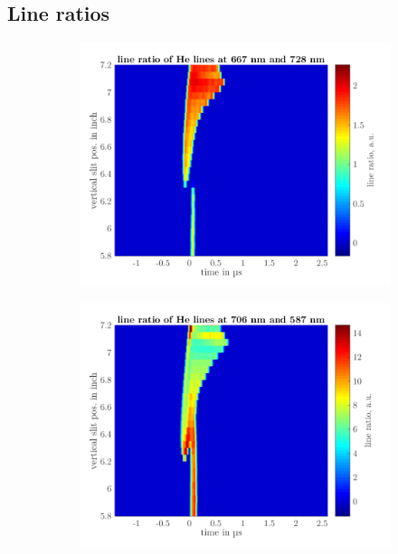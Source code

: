 \documentclass[a4paper,10pt]{article}
\begin{document}
		\twocolumn
		
		\subsection{Line ratios}

		\onecolumn
		
				\begin{figure}
					\centering
			
					\begin{subfigure}[t]{0.48\textwidth}
						\includegraphics[width=\textwidth]{figures/results/lineratios/square/lineratio667}
						\vspace{-0.5cm}\caption{}
						\label{img:ratio667}
					\end{subfigure}
					\hfill
					\begin{subfigure}[t]{0.48\textwidth}
						\includegraphics[width=\textwidth]{figures/results/lineratios/square/lineratio706}
						\vspace{-0.5cm}\caption{}
						\label{img:ratio7065}
					\end{subfigure}
					

\end{figure}
\end{document}
